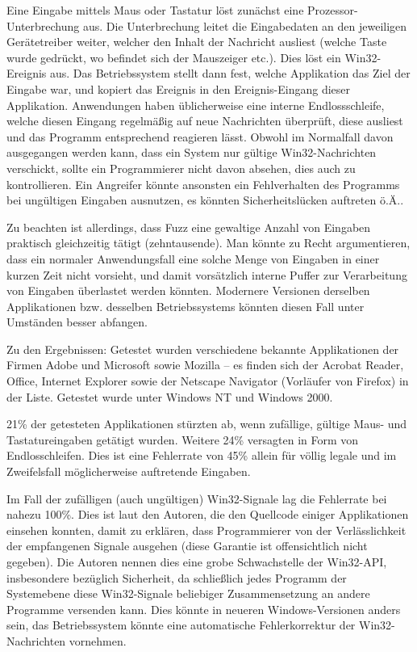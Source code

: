 Eine Eingabe mittels Maus oder Tastatur löst zunächst eine Prozessor-Unterbrechung aus. Die Unterbrechung
leitet die Eingabedaten an den jeweiligen Gerätetreiber weiter, welcher den Inhalt der Nachricht ausliest
(welche Taste wurde gedrückt, wo befindet sich der Mauszeiger etc.). Dies löst ein Win32-Ereignis
aus. Das Betriebssystem stellt dann fest, welche Applikation das Ziel der Eingabe war, und kopiert
das Ereignis in den Ereignis-Eingang dieser Applikation. Anwendungen haben üblicherweise eine interne
Endlossschleife, welche diesen Eingang regelmäßig auf neue Nachrichten überprüft, diese ausliest und das
Programm entsprechend reagieren lässt. Obwohl im Normalfall davon ausgegangen werden kann, dass ein System
nur gültige Win32-Nachrichten verschickt, sollte ein Programmierer nicht davon absehen, dies auch
zu kontrollieren. Ein Angreifer könnte ansonsten ein Fehlverhalten des Programms bei ungültigen Eingaben
ausnutzen, es könnten Sicherheitslücken auftreten ö.Ä..

Zu beachten ist allerdings, dass \glqq{}Fuzz\grqq{} eine gewaltige Anzahl von Eingaben praktisch gleichzeitig tätigt
(zehntausende). Man könnte zu Recht argumentieren, dass ein normaler Anwendungsfall eine solche Menge von
Eingaben in einer kurzen Zeit nicht vorsieht, und damit vorsätzlich interne Puffer zur 
Verarbeitung von Eingaben überlastet werden
könnten. Modernere Versionen derselben Applikationen bzw. desselben Betriebssystems könnten diesen Fall 
unter Umständen besser abfangen.

\vspace{0.5cm}


Zu den Ergebnissen: Getestet wurden verschiedene bekannte Applikationen der Firmen Adobe und Microsoft sowie Mozilla -- es
finden sich der Acrobat Reader, Office, Internet Explorer sowie der Netscape Navigator 
(Vorläufer von Firefox) in der Liste. Getestet wurde unter Windows NT und Windows 2000.

21\% der getesteten Applikationen stürzten ab, wenn zufällige, gültige Maus- und Tastatureingaben 
getätigt wurden. Weitere 24\% versagten in Form von Endlosschleifen. Dies ist eine Fehlerrate von 45\%
allein für völlig legale und im Zweifelsfall möglicherweise auftretende Eingaben.

Im Fall der zufälligen (auch ungültigen) Win32-Signale lag die Fehlerrate bei nahezu 100\%. Dies ist
laut den Autoren, die den Quellcode einiger Applikationen einsehen konnten, damit zu erklären,
dass Programmierer von der Verlässlichkeit der empfangenen Signale ausgehen (diese Garantie ist offensichtlich
nicht gegeben). Die Autoren nennen dies eine grobe Schwachstelle der Win32-API, insbesondere bezüglich
Sicherheit, da schließlich jedes Programm der Systemebene diese Win32-Signale beliebiger Zusammensetzung
an andere Programme versenden kann. Dies könnte in neueren Windows-Versionen anders sein, das Betriebssystem
könnte eine automatische Fehlerkorrektur der Win32-Nachrichten vornehmen.


